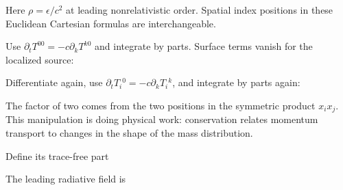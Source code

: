 \documentclass[
  11pt,
  letterpaper,
  oneside,
  openany]{scrbook}
\begin{document}
Here \(\rho=\epsilon/c^2\) at leading nonrelativistic order. Spatial
index positions in these Euclidean Cartesian formulas are
interchangeable.

Use \(\partial_tT^{00}=-c\partial_kT^{k0}\) and integrate by parts.
Surface terms vanish for the localized source:

\begin{center}
\begingroup
{}
\ifdim\wd\grmathbox>\linewidth
\resizebox{\linewidth}{!}{\usebox{\grmathbox}}
\else\usebox{\grmathbox}\fi
\endgroup
\end{center}

Differentiate again, use \(\partial_tT_i{}^0=-c\partial_kT_i{}^k\), and
integrate by parts again:

\begin{center}
\begingroup
{}
\ifdim\wd\grmathbox>\linewidth
\resizebox{\linewidth}{!}{\usebox{\grmathbox}}
\else\usebox{\grmathbox}\fi
\endgroup
\end{center}

The factor of two comes from the two positions in the symmetric product
\(x_i x_j\). This manipulation is doing physical work: conservation
relates momentum transport to changes in the shape of the mass
distribution.

Define its trace-free part

\begin{center}
\begingroup
{}
\ifdim\wd\grmathbox>\linewidth
\resizebox{\linewidth}{!}{\usebox{\grmathbox}}
\else\usebox{\grmathbox}\fi
\endgroup
\end{center}

The leading radiative field is

\begin{center}
\begingroup
{}
\ifdim\wd\grmathbox>\linewidth
\resizebox{\linewidth}{!}{\usebox{\grmathbox}}
\else\usebox{\grmathbox}\fi
\endgroup
\end{center}
\end{document}
